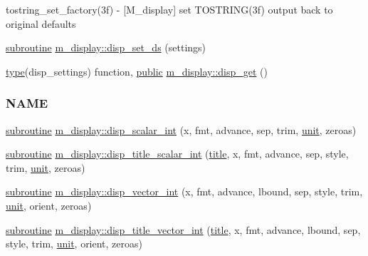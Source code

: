 \begin{DoxyCompactItemize}
\begin{DoxyCompactList}
tostring\+\_\+set\+\_\+factory(3f) -\/ \mbox{[}M\+\_\+display\mbox{]} set T\+O\+S\+T\+R\+I\+N\+G(3f) output back to original defaults \end{DoxyCompactList}\item 
\hyperlink{M__stopwatch_83_8txt_acfbcff50169d691ff02d4a123ed70482}{subroutine} \hyperlink{namespacem__display_a6296917336a62e43005e56c48340eaf1}{m\+\_\+display\+::disp\+\_\+set\+\_\+ds} (settings)
\item 
\hyperlink{stop__watch_83_8txt_a70f0ead91c32e25323c03265aa302c1c}{type}(disp\+\_\+settings) function, \hyperlink{M__stopwatch_83_8txt_a2f74811300c361e53b430611a7d1769f}{public} \hyperlink{namespacem__display_a6a49f987c37a95e67744950ecee69530}{m\+\_\+display\+::disp\+\_\+get} ()
\begin{DoxyCompactList}\small\item\em \subsubsection*{N\+A\+ME}\end{DoxyCompactList}\item 
\hyperlink{M__stopwatch_83_8txt_acfbcff50169d691ff02d4a123ed70482}{subroutine} \hyperlink{namespacem__display_adddf4774edf1fedf5b1f02f47fbbc82f}{m\+\_\+display\+::disp\+\_\+scalar\+\_\+int} (x, fmt, advance, sep, trim, \hyperlink{M__stopwatch_83_8txt_a5cbef30eb7c0d734bd82f5a7ebea9aa7}{unit}, zeroas)
\item 
\hyperlink{M__stopwatch_83_8txt_acfbcff50169d691ff02d4a123ed70482}{subroutine} \hyperlink{namespacem__display_afaae34a88f7f2d5799469f0a6214e0b2}{m\+\_\+display\+::disp\+\_\+title\+\_\+scalar\+\_\+int} (\hyperlink{print__watch_83_8txt_a15b5bd21156bb9fca6a755ab8c029a9c}{title}, x, fmt, advance, sep, style, trim, \hyperlink{M__stopwatch_83_8txt_a5cbef30eb7c0d734bd82f5a7ebea9aa7}{unit}, zeroas)
\item 
\hyperlink{M__stopwatch_83_8txt_acfbcff50169d691ff02d4a123ed70482}{subroutine} \hyperlink{namespacem__display_abbb9f5e78b3998c8fa9774d594152dcc}{m\+\_\+display\+::disp\+\_\+vector\+\_\+int} (x, fmt, advance, lbound, sep, style, trim, \hyperlink{M__stopwatch_83_8txt_a5cbef30eb7c0d734bd82f5a7ebea9aa7}{unit}, orient, zeroas)
\item 
\hyperlink{M__stopwatch_83_8txt_acfbcff50169d691ff02d4a123ed70482}{subroutine} \hyperlink{namespacem__display_a8393f81379778fc9d955bf1e0961aee1}{m\+\_\+display\+::disp\+\_\+title\+\_\+vector\+\_\+int} (\hyperlink{print__watch_83_8txt_a15b5bd21156bb9fca6a755ab8c029a9c}{title}, x, fmt, advance, lbound, sep, style, trim, \hyperlink{M__stopwatch_83_8txt_a5cbef30eb7c0d734bd82f5a7ebea9aa7}{unit}, orient, zeroas)

\end{DoxyCompactItemize}
